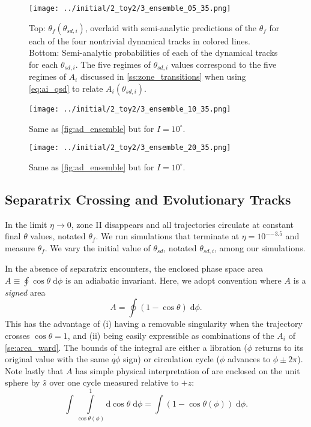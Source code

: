 \documentclass[
        fleqn,
        usenatbib,
    ]{mnras}
\newcommand*{\p}[1]{\left(#1\right)}
\begin{document}
\begin{figure}
    \centering
    \texttt{[image: ../initial/2\_toy2/3\_ensemble\_05\_35.png]}
    \caption{Top: $\theta_{f}\p{\theta_{sd, i}}$, overlaid with semi-analytic
    predictions of the $\theta_{ f}$ for each of the four nontrivial
    dynamical tracks in colored lines. Bottom: Semi-analytic probabilities of
    each of the dynamical tracks for each $\theta_{sd, i}$. The five regimes of
    $\theta_{sd, i}$ values correspond to the five regimes of $A_i$ discussed in
    \autoref{ss:zone_transitions} when using \autoref{eq:ai_qsd} to relate
    $A_i\p{\theta_{sd, i}}$. }\label{fig:ad_ensemble}
\end{figure}
\begin{figure}
    \centering
    \texttt{[image: ../initial/2\_toy2/3\_ensemble\_10\_35.png]}
    \caption{Same as \autoref{fig:ad_ensemble} but for $I =
    10^\circ$.}\label{fig:3_ensemble_10_35}
\end{figure}
\begin{figure}
    \texttt{[image: ../initial/2\_toy2/3\_ensemble\_20\_35.png]}
    \caption{Same as \autoref{fig:ad_ensemble} but for $I =
    10^\circ$.}\label{fig:3_ensemble_20_35}
\end{figure}

\subsection{Separatrix Crossing and Evolutionary Tracks
}\label{ss:zone_transitions}

In the limit $\eta \to 0$, zone II disappears and all trajectories circulate at
constant final $\theta$ values, notated $\theta_f$. We run simulations that
terminate at $\eta = 10^{-{-3.5}}$ and measure $\theta_{f}$. We vary the initial
value of $\theta_{sd}$, notated $\theta_{sd, i}$, among our simulations.

In the absence of separatrix encounters, the enclosed phase space area $A \equiv
\oint \cos\theta \;\mathrm{d}\phi$ is an adiabatic invariant. Here, we adopt
convention where $A$ is a \emph{signed} area
\begin{equation}
    A = \oint \p{1 - \cos \theta}\;\mathrm{d}\phi.
\end{equation}
This has the advantage of (i) having a removable singularity when the trajectory
crosses $\cos \theta = 1$, and (ii) being easily expressible as combinations of
the $A_i$ of \autoref{se:area_ward}. The bounds of the integral are either a
libration ($\phi$ returns to its original value with the same $\dot{q\phi}$
sign) or circulation cycle ($\phi$ advances to $\phi \pm 2\pi$). Note lastly
that $A$ has simple physical interpretation of are enclosed on the unit sphere
by $\hat{s}$ over one cycle measured relative to $+\hat{z}$:
\begin{equation*}
    \int \int\limits_{\cos \theta(\phi)}^1
        \mathrm{d}\cos\theta\;\mathrm{d}\phi = \int \p{1 - \cos \theta(\phi)}
            \;\mathrm{d}\phi.
\end{equation*}
\end{document}
